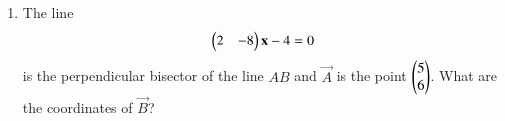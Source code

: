\begin{enumerate}[label=\arabic*.,ref=\thesubsection.\theenumi]

\item The line
\begin{align}
\begin{pmatrix}2 &-8\end{pmatrix}\mathbf{x}-4=0
\end{align}
is the perpendicular bisector of the line $AB$ and $\vec{A}$ is the point $\begin{pmatrix}5\\6\end{pmatrix}$. What are the coordinates of $\vec{B}$?
\end{enumerate}
